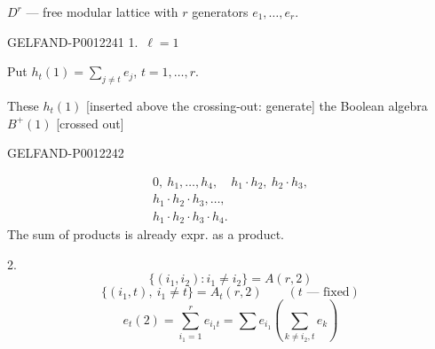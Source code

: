 \(D^r\) --- free modular lattice with \(r\) generators \(e_1,\ldots,e_r\).


\begin{GelfandAdjacentEvidence}{GELFAND-P001224}{1}
1.\ \underline{\(\ell=1\)}

Put \(h_t(1)=\displaystyle\sum_{j\ne t}e_j\), \(t=1,\ldots,r\).

These \(h_t(1)\) [inserted above the crossing-out: generate] the Boolean algebra
\(B^+(1)\) [crossed out]
\end{GelfandAdjacentEvidence}
\begin{GelfandAdjacentEvidence}{GELFAND-P001224}{2}

\begin{equation*}
\begin{gathered}
0,\ h_1,\ldots,h_4,\quad h_1\cdot h_2,\ h_2\cdot h_3,\\
h_1\cdot h_2\cdot h_3,\ldots,\\
h_1\cdot h_2\cdot h_3\cdot h_4.
\end{gathered}
\end{equation*}
The sum of products is already expr. as a product.

2.\ 
\begin{equation*}
\{(i_1,i_2):i_1\ne i_2\}=A(r,2)
\end{equation*}
\begin{equation*}
\{(i_1,t),\ i_1\ne t\}=A_t(r,2)\qquad(t\text{ --- fixed})
\end{equation*}
\begin{equation*}
e_t(2)=\sum_{i_1=1}^{r}e_{i_1t}
=\sum e_{i_1}\left(\sum_{k\ne i_2,t}e_k\right)
\end{equation*}
\end{GelfandAdjacentEvidence}
